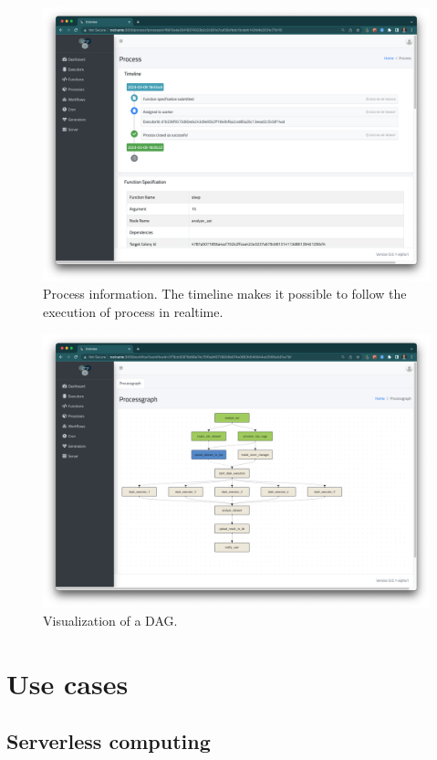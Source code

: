 \documentclass{article}
\begin{document}
\begin{figure}[h]
	\centering
    \includegraphics[scale=0.25]{dashboard1.png}
	\caption{Process information. The timeline makes it possible to follow the execution of process in realtime.}
	\label{fig:dashboard1}
\end{figure}

\begin{figure}[h]
	\centering
    \includegraphics[scale=0.25]{dashboard2.png}
	\caption{Visualization of a DAG.}
	\label{fig:dashboard2}
\end{figure}

\section{Use cases}
\subsection{Serverless computing}
\label{faas}
\end{document}
